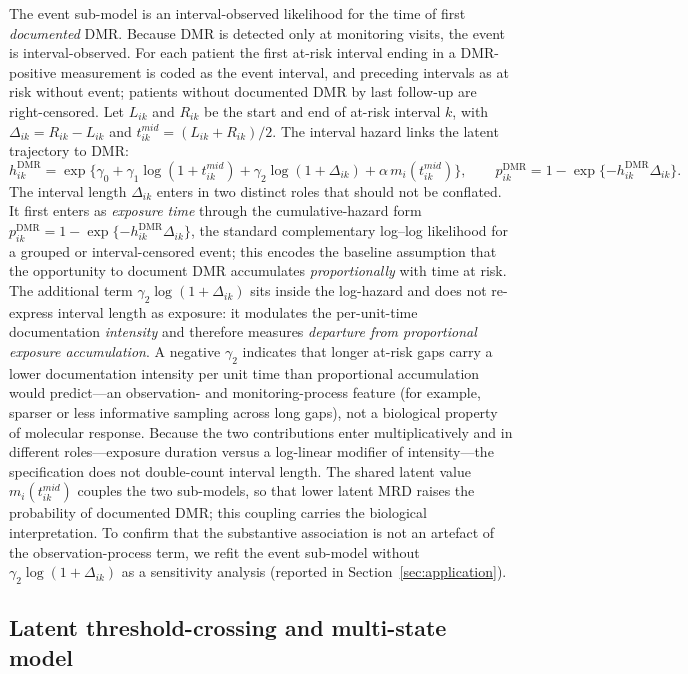 \documentclass[11pt]{article}
\begin{document}
The event sub-model is an interval-observed likelihood for the time of first
\emph{documented} DMR. Because DMR is detected only at monitoring visits, the
event is interval-observed. For each patient the first at-risk interval ending in a
DMR-positive measurement is coded as the event interval, and preceding
intervals as at risk without event; patients without documented DMR by
last follow-up are right-censored. Let $L_{ik}$ and $R_{ik}$ be the start
and end of at-risk interval $k$, with $\Delta_{ik}=R_{ik}-L_{ik}$ and
$t_{ik}^{mid}=(L_{ik}+R_{ik})/2$. The interval hazard links the latent
trajectory to DMR:
\[
h_{ik}^{\mathrm{DMR}}=
\exp\{\gamma_0+\gamma_1\log(1+t_{ik}^{mid})
+\gamma_2\log(1+\Delta_{ik})
+\alpha\, m_i(t_{ik}^{mid})\},
\qquad
p_{ik}^{\mathrm{DMR}}=
1-\exp\{-h_{ik}^{\mathrm{DMR}}\Delta_{ik}\}.
\]
The interval length $\Delta_{ik}$ enters in two distinct roles that should
not be conflated. It first enters as \emph{exposure time} through the
cumulative-hazard form
$p_{ik}^{\mathrm{DMR}}=1-\exp\{-h_{ik}^{\mathrm{DMR}}\Delta_{ik}\}$, the
standard complementary log--log likelihood for a grouped or interval-censored
event; this encodes the baseline assumption that the opportunity to document
DMR accumulates \emph{proportionally} with time at risk. The additional term
$\gamma_2\log(1+\Delta_{ik})$ sits inside the log-hazard and does not
re-express interval length as exposure: it modulates the per-unit-time
documentation \emph{intensity} and therefore measures \emph{departure from
proportional exposure accumulation}. A negative $\gamma_2$ indicates that
longer at-risk gaps carry a lower documentation intensity per unit time than
proportional accumulation would predict---an observation- and
monitoring-process feature (for example, sparser or less informative sampling
across long gaps), not a biological property of molecular response. Because
the two contributions enter multiplicatively and in different roles---exposure
duration versus a log-linear modifier of intensity---the specification does
not double-count interval length. The shared latent value
$m_i(t_{ik}^{mid})$ couples the two sub-models, so that lower latent MRD raises
the probability of documented DMR; this coupling carries the biological
interpretation. To confirm that the substantive association is not an artefact
of the observation-process term, we refit the event sub-model without
$\gamma_2\log(1+\Delta_{ik})$ as a sensitivity analysis (reported in
Section~\ref{sec:application}).

\subsection{Latent threshold-crossing and multi-state model}
\label{sec:threshold}
\end{document}
